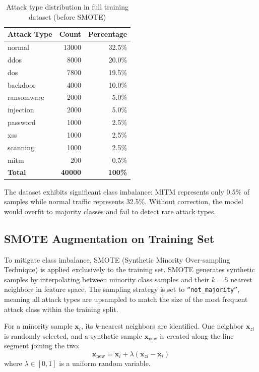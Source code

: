 \documentclass[12pt,a4paper]{report}
\begin{document}
\begin{table}[htbp]
  \centering
  \caption{Attack type distribution in full training dataset (before SMOTE)}
  \label{tab:class-distribution}
  \begin{tabular}{lrr}
    \toprule
    \textbf{Attack Type} & \textbf{Count} & \textbf{Percentage} \\
    \midrule
    normal      & 13000 & 32.5\% \\
    ddos        & 8000  & 20.0\% \\
    dos         & 7800  & 19.5\% \\
    backdoor    & 4000  & 10.0\% \\
    ransomware  & 2000  & 5.0\% \\
    injection   & 2000  & 5.0\% \\
    password    & 1000  & 2.5\% \\
    xss         & 1000  & 2.5\% \\
    scanning    & 1000  & 2.5\% \\
    mitm        & 200   & 0.5\% \\
    \midrule
    \textbf{Total} & \textbf{40000} & \textbf{100\%} \\
    \bottomrule
  \end{tabular}
\end{table}

The dataset exhibits significant class imbalance: MITM represents only 0.5\% of samples while normal traffic represents 32.5\%. Without correction, the model would overfit to majority classes and fail to detect rare attack types.

\subsection{SMOTE Augmentation on Training Set}

To mitigate class imbalance, SMOTE (Synthetic Minority Over-sampling Technique) is applied exclusively to the training set. SMOTE generates synthetic samples by interpolating between minority class samples and their $k=5$ nearest neighbors in feature space. The sampling strategy is set to \texttt{``not\_majority''}, meaning all attack types are upsampled to match the size of the most frequent attack class within the training split.

For a minority sample $\mathbf{x}_i$, its $k$-nearest neighbors are identified. One neighbor $\mathbf{x}_{zi}$ is randomly selected, and a synthetic sample $\mathbf{x}_{\text{new}}$ is created along the line segment joining the two:
\begin{equation}
  \mathbf{x}_{\text{new}} = \mathbf{x}_i + \lambda (\mathbf{x}_{zi} - \mathbf{x}_i)
\end{equation}
where $\lambda \in [0,1]$ is a uniform random variable.
\end{document}
